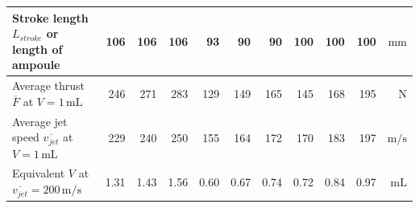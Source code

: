 \begin{landscape}
\begin{table}[]
\begin{tabular}{l|rrr|rrr|rrr|r}
                Stroke length $L_{stroke}$ or length of ampoule              & 106            & 106            & 106            & 93             & 90             & 90             & 100            & 100            & 100            & $\mathrm{mm}$  \\
                \hline
                Average thrust $\overline{F}$ at $V=1\,\mathrm{mL}$          & 246            & 271            & 283            & 129            & 149            & 165            & 145            & 168            & 195            & $\mathrm{N}$   \\
                Average jet speed $\overline{v_{jet}}$ at $V=1\,\mathrm{mL}$ & 229            & 240            & 250            & 155            & 164            & 172            & 170            & 183            & 197            & $\mathrm{m/s}$ \\
                Equivalent $V$ at $\overline{v_{jet}}=200\,\mathrm{m/s}$     & 1.31           & 1.43           & 1.56           & 0.60           & 0.67           & 0.74           & 0.72           & 0.84           & 0.97           & $\mathrm{mL}$ \\
                \hline
                \end{tabular}
            \end{table}
        \end{landscape}